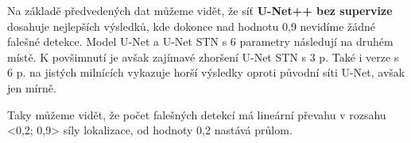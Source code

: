 Na základě předvedených dat můžeme vidět, že síť \textbf{U-Net++ bez supervize} dosahuje nejlepších výsledků, kde dokonce nad hodnotu 0,9 nevidíme žádné falešné detekce. Model U-Net a U-Net STN s 6 parametry následují na druhém místě.  K povšimnutí je avšak zajímavé zhoršení  U-Net STN s 3 p. Také i verze s 6 p. na jistých milnících vykazuje horší výsledky oproti původní síti U-Net, avšak jen mírně.

Taky můžeme vidět, že počet falešných detekcí má lineární převahu v rozsahu <0,2; 0,9> síly lokalizace, od hodnoty 0,2 nastává průlom.
\endinput
